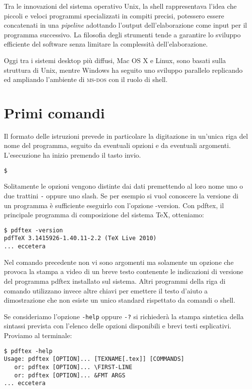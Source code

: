 Tra le innovazioni del sistema operativo Unix, la shell rappresentava l'idea che
piccoli e veloci programmi specializzati in compiti precisi, potessero essere
concatenati in una \emph{pipeline} adottando l'output dell'elaborazione come
input per il programma successivo. La filosofia degli strumenti tende a
garantire lo sviluppo efficiente del software senza limitare la complessità
dell'elaborazione.

Oggi tra i sistemi desktop più diffusi, Mac OS X e Linux, sono basati sulla
struttura di Unix, mentre Windows ha seguito uno sviluppo parallelo replicando
ed ampliando l'ambiente di \textsc{ms-dos} con il ruolo di shell.



\section{Primi comandi}

Il formato delle istruzioni prevede in particolare la digitazione in un'unica
riga del nome del programma, seguito da eventuali opzioni e da eventuali
argomenti. L'esecuzione ha inizio premendo il tasto invio.
\medskip

\texttt{\$   }
\medskip

Solitamente le opzioni vengono distinte dai dati premettendo al loro nome uno o
due trattini \texttt{-} oppure uno slash. Se per esempio si vuol conoscere la
versione di un programma è sufficiente eseguirlo con l'opzione
\textsf{-version}. Con \textsf{pdftex}, il principale programma di composizione
del sistema \TeX{}, otteniamo:
\begin{verbatim}
$ pdftex -version
pdfTeX 3.1415926-1.40.11-2.2 (TeX Live 2010)
... eccetera
\end{verbatim}

Nel comando precedente non vi sono argomenti ma solamente un opzione che provoca
la stampa a video di un breve testo contenente le indicazioni di versione del
programma \textsf{pdftex} installato sul sistema. Altri programmi della riga di
comando utilizzano invece altre chiavi per emettere il testo d'aiuto a
dimostrazione che non esiste un unico standard rispettato da comandi o shell.

Se consideriamo l'opzione \texttt{-help} oppure \texttt{-?} si richiederà la
stampa sintetica della sintassi prevista con l'elenco delle opzioni disponibili
e brevi testi esplicativi. Proviamo al terminale:
\begin{verbatim}
$ pdftex -help
Usage: pdftex [OPTION]... [TEXNAME[.tex]] [COMMANDS]
   or: pdftex [OPTION]... \FIRST-LINE
   or: pdftex [OPTION]... &FMT ARGS
... eccetera
\end{verbatim}


